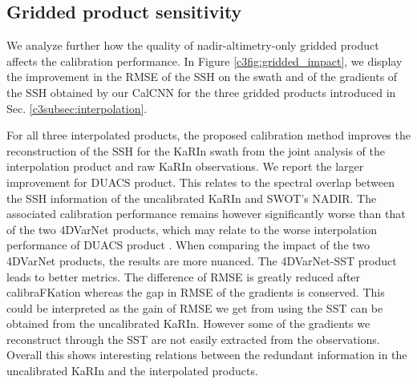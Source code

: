 \begin{bibunit}
\subsection*{Gridded product sensitivity} 
\label{c3subsec:gridded_sens}
\noindent

We analyze further how the quality of nadir-altimetry-only gridded product affects the calibration performance.
In Figure \ref{c3fig:gridded_impact}, we display the improvement in the RMSE of the SSH on the swath and of the gradients of the SSH obtained by our CalCNN for the three gridded products introduced in Sec. \ref{c3subsec:interpolation}.

For all three interpolated products, the proposed calibration method improves the reconstruction of the SSH for the KaRIn swath from the joint analysis of the interpolation product and raw KaRIn observations. We report the larger improvement for DUACS product. This relates to the spectral overlap between the SSH information of the uncalibrated KaRIn and SWOT's NADIR. The associated calibration performance remains however significantly worse than that of the two 4DVarNet products, which may relate to the worse interpolation performance of DUACS product \cite{fablet_end2end_2021,osse_data_challenge}. 
When comparing the impact of the two 4DVarNet products, the results are more nuanced. The 4DVarNet-SST product leads to better metrics. The difference of RMSE is greatly reduced after calibraFKation whereas the gap in RMSE of the gradients is conserved.
This could be interpreted as the gain of RMSE we get from using the SST can be obtained from the uncalibrated KaRIn. However some of the gradients we reconstruct through the SST are not easily extracted from the observations.
Overall this shows interesting relations between the redundant information in the uncalibrated KaRIn and the interpolated products.


\end{bibunit}
